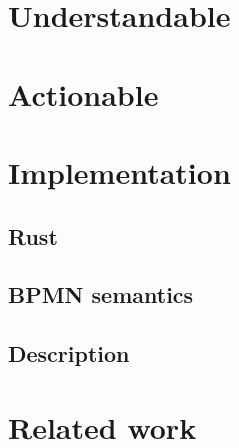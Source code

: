 \documentclass[runningheads]{llncs}
\begin{document}
\section{Understandable}

\cite{camundaservicesgmbhBpmnjsTokenSimulation2023}

\section{Actionable}


\section{Implementation}

\subsection{Rust}

\subsection{BPMN semantics}
\subsection{Description}
\cite{camundaservicesgmbhBpmnjs2023}

\section{Related work}
\end{document}
